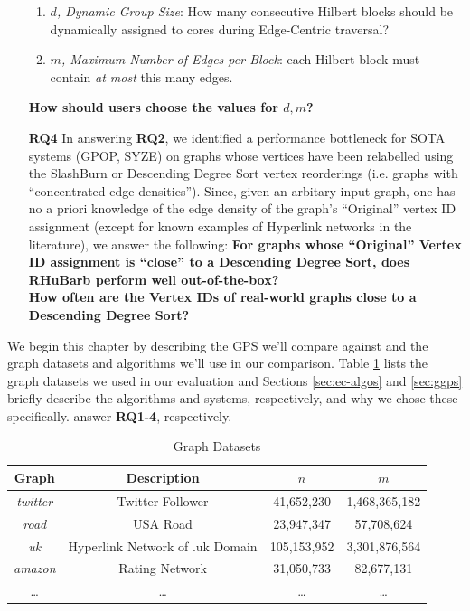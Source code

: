 \begin{itemize}
    \begin{enumerate}
        \item \textit{$d$, Dynamic Group Size}: How many consecutive Hilbert blocks should be dynamically assigned to cores during Edge-Centric traversal?
        \item \textit{$m$, Maximum Number of Edges per Block}: each Hilbert block must contain \textit{at most} this many edges. 
    \end{enumerate}
    \textbf{How should users choose the values for $d, m$?}
    \item [\textbf{RQ4}] In answering \textbf{RQ2}, we identified a performance bottleneck for SOTA systems (GPOP, SYZE) on graphs whose vertices have been relabelled using the SlashBurn or Descending Degree Sort vertex reorderings (i.e. graphs with ``concentrated edge densities''). Since, given an arbitary input graph, one has no a priori knowledge of the edge density of the graph's ``Original'' vertex ID assignment (except for known examples of Hyperlink networks in the literature), we answer the following:
    \textbf{For graphs whose ``Original'' Vertex ID assignment is ``close'' to a Descending Degree Sort, does RHuBarb perform well out-of-the-box?}\\
    \textbf{How often are the Vertex IDs of real-world graphs close to a Descending Degree Sort?}
\end{itemize}

We begin this chapter by describing the GPS we'll compare against and the graph datasets and algorithms we'll use in our comparison.
Table \ref{Tab:datasets} lists the graph datasets we used in our evaluation and Sections \ref{sec:ec-algos} and \ref{sec:ggps} briefly describe the algorithms and systems, respectively, and why we chose these specifically.
 answer \textbf{RQ1-4}, respectively.

\begin{table}[ht]
    \caption{Graph Datasets}
    \centering
    \hspace*{-2cm}
    \begin{tabular}{ |c| c| c| c | }
        \hline
        Graph            & Description      & $n$        & $m$           \\
        \hline
        \textit{twitter} & Twitter Follower & 41,652,230 & 1,468,365,182 \\
        \hline
        \textit{road} & USA Road & 23,947,347  & 57,708,624  \\
        \hline
        \textit{uk} & Hyperlink Network of .uk Domain & 105,153,952   & 3,301,876,564   \\
        \hline
        \textit{amazon} & Rating Network & 31,050,733    & 82,677,131    \\
        \hline
        \ldots & \ldots & \ldots & \ldots \\
        \hline
    \end{tabular}
    \label{Tab:datasets}
\end{table}





